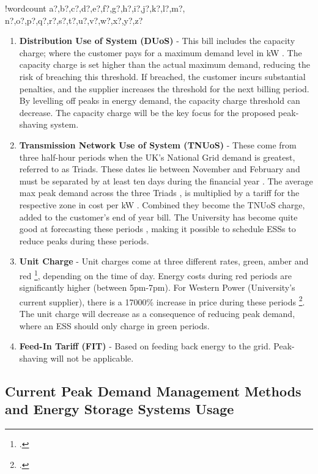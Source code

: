 \documentclass[fontsize=9.5pt]{extarticle}
\newcounter{words}
\newenvironment{counted}{%
  \setcounter{words}{0}
  \SearchList!{wordcount}{\stepcounter{words}}
    {a?,b?,c?,d?,e?,f?,g?,h?,i?,j?,k?,l?,m?,
    n?,o?,p?,q?,r?,s?,t?,u?,v?,w?,x?,y?,z?}
  \UndoBoundary{'}
  \SearchOrder{p;}}{%
  \StopSearching}
\begin{document}
\begin{counted}
\begin{enumerate}
\item \textbf{Distribution Use of System (DUoS)} - This bill includes the capacity charge; where the customer pays for a maximum demand level in kW \cite{Deconstr52:online}. The capacity charge is set higher than the actual maximum demand, reducing the risk of breaching this threshold. If breached, the customer incurs substantial penalties, and the supplier increases the threshold for the next billing period. By levelling off peaks in energy demand, the capacity charge threshold can decrease. The capacity charge will be the key focus for the proposed peak-shaving system.
\item \textbf{Transmission Network Use of System (TNUoS)} - These come from three half-hour periods when the UK's National Grid demand is greatest, referred to as Triads. These dates lie between November and February and must be separated by at least ten days during the financial year \cite{TriadsWh7:online}. The average max peak demand across the three Triads \cite{TNUoSTra99:online}, is multiplied by a tariff for the respective zone in cost per kW \cite{TNUoScha93:online}. Combined they become the TNUoS charge, added to the customer's end of year bill. The University has become quite good at forecasting these periods \cite{Jbrentmeet}, making it possible to schedule ESSs to reduce peaks during these periods.
\item \textbf{Unit Charge} - Unit charges come at three different rates, green, amber and red \footcite[See page 27 of][]{SWEB201492:online}, depending on the time of day. Energy costs during red periods are significantly higher (between 5pm-7pm). For Western Power (University's current supplier), there is a 17000\% increase in price during these periods \footcite[25.405 p/kWh in red periods against 0.147p/kWh in green periods][]{SWEB201492:online}. The unit charge will decrease as a consequence of reducing peak demand, where an ESS should only charge in green periods.
\item \textbf{Feed-In Tariff (FIT)} - Based on feeding back energy to the grid. Peak-shaving will not be applicable.
\end{enumerate}

\subsection{Current Peak Demand Management Methods and Energy Storage
Systems
Usage}\label{current-peak-demand-management-methods-and-energy-storage-systems-usage}


\end{counted}
\end{document}
